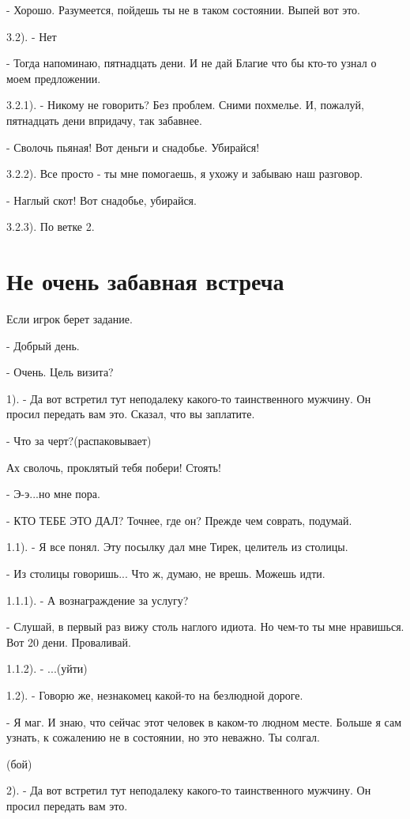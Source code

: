 \documentclass[12pt,a4paper]{book}
\begin{document}
- Хорошо. Разумеется, пойдешь ты не в таком состоянии. Выпей вот это.

3.2). - Нет

- Тогда напоминаю, пятнадцать дени. И не дай Благие что бы кто-то узнал о моем предложении.

3.2.1). - Никому не говорить? Без проблем. Сними похмелье. И, пожалуй, пятнадцать дени впридачу, так забавнее.

- Сволочь пьяная! Вот деньги и снадобье. Убирайся!   

3.2.2). Все просто - ты мне помогаешь, я ухожу и забываю наш разговор.

- Наглый скот! Вот снадобье, убирайся.

3.2.3). По ветке 2.

\section{Не очень забавная встреча}

Если игрок берет задание.

- Добрый день.

- Очень. Цель визита?

1). - Да вот встретил тут неподалеку какого-то таинственного мужчину. Он просил передать вам это. Сказал, что вы заплатите.

- Что за черт?(распаковывает)

Ах сволочь, проклятый тебя побери! Стоять!

- Э-э...но мне пора.

- КТО ТЕБЕ ЭТО ДАЛ? Точнее, где он? Прежде чем соврать, подумай.

1.1). - Я все понял. Эту посылку дал мне Тирек, целитель из столицы.

- Из столицы говоришь... Что ж, думаю, не врешь. Можешь идти.

1.1.1). - А вознаграждение за услугу?

- Слушай, в первый раз вижу столь наглого идиота. Но чем-то ты мне нравишься. Вот 20 дени. Проваливай.

1.1.2). - ...(уйти)

1.2). - Говорю же, незнакомец какой-то на безлюдной дороге.

- Я маг. И знаю, что сейчас этот человек в каком-то людном месте. Больше я сам узнать, к сожалению не в состоянии, но это неважно. Ты солгал.

(бой)

2). - Да вот встретил тут неподалеку какого-то таинственного мужчину. Он просил передать вам это.
\end{document}
